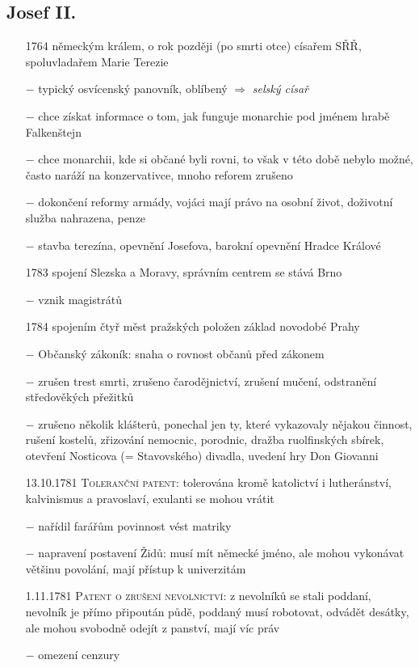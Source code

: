 \documentclass{article}
\begin{document}
\subsection*{Josef II.}
\begin{itemize}
    \vspace{-0.5em}
    \setlength\itemsep{0.15em}
    \item[1764] německým králem, o rok později (po smrti otce) císařem SŘŘ, spoluvladařem Marie Terezie
    \item[$-$] typický osvícenský panovník, oblíbený $\Rightarrow$ \textit{selský císař}
    \item[$-$] chce získat informace o tom, jak funguje monarchie pod jménem hrabě Falkenštejn
    \item[$-$] chce monarchii, kde si občané byli rovni, to však v této době nebylo možné, často naráží na konzervativce, mnoho reforem zrušeno
    \item[$-$] dokončení reformy armády, vojáci mají právo na osobní život, doživotní služba nahrazena, penze
    \item[$-$] stavba terezína, opevnění Josefova, barokní opevnění Hradce Králové
    \item[1783] spojení Slezska a Moravy, správním centrem se stává Brno
    \item[$-$] vznik magistrátů
    \item[1784] spojením čtyř měst pražských položen základ novodobé Prahy
    \item[$-$] Občanský zákoník: snaha o rovnost občanů před zákonem
    \item[$-$] zrušen trest smrti, zrušeno čarodějnictví, zrušení mučení, odstranění středověkých přežitků
    \item[$-$] zrušeno několik klášterů, ponechal jen ty, které vykazovaly nějakou činnost, rušení kostelů, zřizování nemocnic, porodnic, dražba ruolfinských sbírek, otevření Nosticova (= Stavovského) divadla, uvedení hry Don Giovanni
    \item[13.10.1781] \textsc{Toleranční patent}: tolerována kromě katolictví i lutheránství, kalvinismus a pravoslaví, exulanti se mohou vrátit
    \item[$-$] nařídil farářům povinnost vést matriky
    \item[$-$] napravení postavení Židů: musí mít německé jméno, ale mohou vykonávat většinu povolání, mají přístup k univerzitám
    \item[1.11.1781] \textsc{Patent o zrušení nevolnictví}: z nevolníků se stali poddaní, nevolník je přímo připoután půdě, poddaný musí robotovat, odvádět desátky, ale mohou svobodně odejít z panství, mají víc práv
    \item[$-$] omezení cenzury
\end{itemize}
\end{document}
